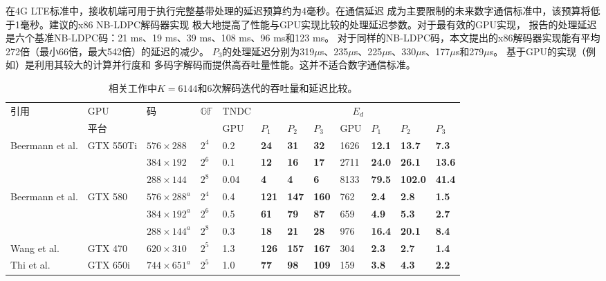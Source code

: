 \documentclass{cjc}
\begin{document}
  在4G LTE标准中，接收机端可用于执行完整基带处理的延迟预算约为4毫秒。在通信延迟
  成为主要限制的未来数字通信标准中，该预算将低于1毫秒。建议的x86 NB-LDPC解码器实现
  极大地提高了性能与GPU实现比较的处理延迟参数。对于最有效的GPU实现\cite{liu_high-throughput_2018}，
  报告的处理延迟是六个基准NB-LDPC码：21 ms、19 ms、39 ms、108 ms、96 ms和123 ms。
  对于同样的NB-LDPC码，本文提出的x86解码器实现能有平均272倍（最小66倍，最大542倍）的延迟的减少。
  $P_3$的处理延迟分别为319$\mu$s、235$\mu$s、225$\mu$s、330$\mu$s、177$\mu$s和279$\mu$s。
  基于GPU的实现（例如\cite{liu_high-throughput_2018}）是利用其较大的计算并行度和
  多码字解码而提供高吞吐量性能。这并不适合数字通信标准。

\begin{table}[htbp]
  \caption{相关工作中$K=6144$和6次解码迭代的吞吐量和延迟比较。}
  \label{tab:6}
  \setlength\tabcolsep{4pt}%
  \begin{tabular}{llllllllllll}
    \toprule
    引用&GPU&码&$\mathbb{GF}$&TNDC&\multicolumn{7}{c}{$E_d$}\\
    &平台&&&GPU&$P_1$&$P_2$&$P_3$&GPU&$P_1$&$P_2$&$P_3$\\
    \midrule
    Beermann et al. \cite{noauthor_beermann_nodate}&GTX 550Ti&$576{\times}288$&$2^4$&0.2&\textbf{24}&\textbf{31}&\textbf{32}&1626&\textbf{12.1}&\textbf{13.7}&\textbf{7.3}\\
    &&$384{\times}192$&$2^6$&0.1&\textbf{12}&\textbf{16}&\textbf{17}&2711&\textbf{24.0}&\textbf{26.1}&\textbf{13.6}\\
    &&$288{\times}144$&$2^8$&0.04&\textbf{4}&\textbf{4}&\textbf{6}&8133&\textbf{79.5}&\textbf{102.0}&\textbf{41.4}\\
    Beermann et al. \cite{beermann_gpu_2015}&GTX 580&$576{\times}288^a$&$2^4$&0.4&\textbf{121}&\textbf{147}&\textbf{160}&762&\textbf{2.4}&\textbf{2.8}&\textbf{1.5}\\
    &&$384{\times}192^a$&$2^6$&0.5&\textbf{61}&\textbf{79}&\textbf{87}&659&\textbf{4.9}&\textbf{5.3}&\textbf{2.7}\\
    &&$288{\times}144^a$&$2^8$&0.3&\textbf{18}&\textbf{21}&\textbf{28}&976&\textbf{16.4}&\textbf{20.1}&\textbf{8.4}\\
    Wang et al. \cite{noauthor_wang_nodate}&GTX 470&$620{\times}310$&$2^5$&1.3&\textbf{126}&\textbf{157}&\textbf{167}&304&\textbf{2.3}&\textbf{2.7}&\textbf{1.4}\\
    Thi et al. \cite{noauthor_thi_nodate}&GTX 650i&$744{\times}651^a$&$2^5$&1.0&\textbf{77}&\textbf{98}&\textbf{109}&159&\textbf{3.8}&\textbf{4.3}&\textbf{2.2}\\

\end{tabular}
\end{table}
\end{document}
